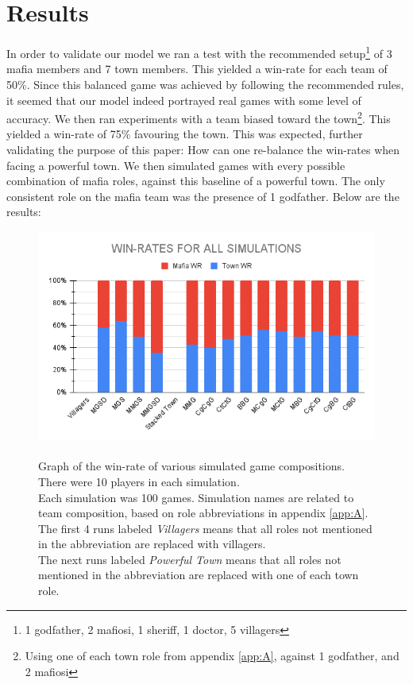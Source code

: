 \section{Results}\label{sec:results}
In order to validate our model we ran a test with the recommended
setup\footnote[1]{1 godfather, 2 mafiosi, 1 sheriff, 1 doctor, 5 villagers} of
3 mafia members and 7 town members\cite{MafiaRules}. This yielded a win-rate
for each team of 50\%. Since this balanced game was achieved by following the
recommended rules, it seemed that our model indeed portrayed real games with
some level of accuracy. We then ran experiments with a team biased toward the
town\footnote{Using one of each town role from appendix \ref{app:A}, against 1
    godfather, and 2 mafiosi}. This yielded a win-rate of 75\% favouring the town.
This was expected, further validating the purpose of this paper: How can one
re-balance the win-rates when facing a powerful town. We then simulated games
with every possible combination of mafia roles, against this baseline of a
powerful town. The only consistent role on the mafia team was the presence of 1
godfather. Below are the results:
\begin{figure}[H]
    \includegraphics[width=1\linewidth]{figures/Winrates}
    \caption{\\Graph of the win-rate of various simulated game compositions.\\
        There were 10 players in each simulation.\\
        Each simulation was 100 games.
        Simulation names are related to team composition, based on role
        abbreviations in appendix \ref{app:A}.\\
        The first 4 runs labeled \textit{Villagers} means that all roles not
        mentioned in the abbreviation are replaced with villagers.\\
        The next runs labeled \textit{Powerful Town} means that all roles not
        mentioned in the abbreviation are replaced with	one of each town role.}
    \label{fig:VariousSimulations}
\end{figure}
